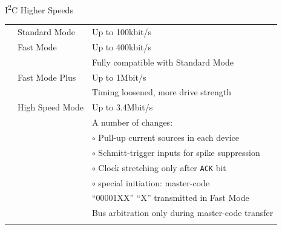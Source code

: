 \documentclass[]{beamer} %
\newcommand{\greenbullet}{\textcolor{bettergreen}\textbullet}
\newcommand{\greencirc}{$ \circ $ }
\newcommand{\twi}{I\textsuperscript{2}C\xspace}
\newcommand{\ack}{\texttt{ACK}\xspace}
\newenvironment{changemargin}[2]
{
	\begin{list}{}
		{
			\setlength{\topsep}{0pt}
			\setlength{\leftmargin}{#1}
			\setlength{\rightmargin}{#2}
			\setlength{\listparindent}{\parindent}
		\setlength{\itemindent}{\parindent}
			\setlength{\parsep}{\parskip}
		}
	\item[]
	}
	{
	\end{list}
}
\begin{document}
\begin{frame}{\twi Higher Speeds}
	\begin{changemargin}{-0.7cm}{+1cm}
		\begin{tabular}{p{0.15cm} p{2.7cm} l}
			\greenbullet & Standard Mode   & Up to 100kbit/s\\
			\greenbullet & Fast Mode       & Up to 400kbit/s\\
		                 &                 & Fully compatible with Standard Mode\\
			\greenbullet & Fast Mode Plus  & Up to 1Mbit/s\\
			             &                 & Timing loosened, more drive strength\\
			\greenbullet & High Speed Mode & Up to 3.4Mbit/s\\
			&                 & A number of changes:\\
			&                 & \greencirc Pull-up current sources in each device\\
			&                 & \greencirc Schmitt-trigger inputs for spike suppression\\
			&                 & \greencirc Clock stretching only after \ack bit\\
			&                 & \greencirc \textrightarrow special initiation: master-code\\
			&                 & ``00001XX'' ``X'' transmitted in Fast Mode\\
			&                 & Bus arbitration only during master-code transfer\\
			\\
		\end{tabular}
	\end{changemargin}
\end{frame}
\end{document}
